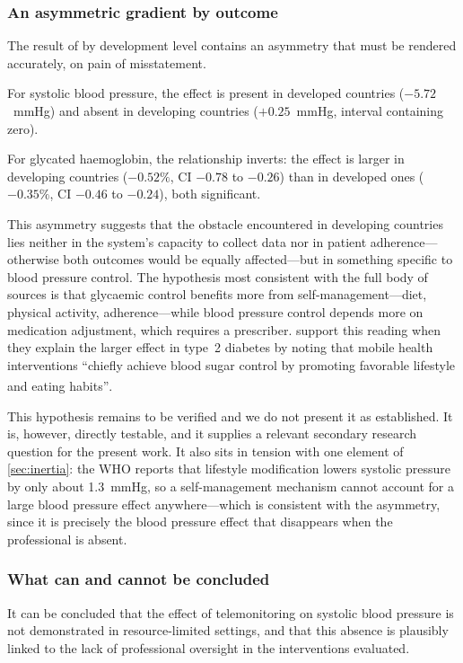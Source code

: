 \documentclass[12pt,a4paper,oneside]{report}
\newcommand{\bq}[1]{``#1''\textsuperscript{\dag}}
\begin{document}
\subsubsection{An asymmetric gradient by outcome}

The result of \textcite{mao2020} by development level contains an asymmetry that must be rendered accurately, on pain of misstatement.

For systolic blood pressure, the effect is present in developed countries ($-5.72$~mmHg) and absent in developing countries ($+0.25$~mmHg, interval containing zero).

For glycated haemoglobin, the relationship inverts: the effect is larger in developing countries ($-0.52\%$, CI $-0.78$ to $-0.26$) than in developed ones ($-0.35\%$, CI $-0.46$ to $-0.24$), both significant.

This asymmetry suggests that the obstacle encountered in developing countries lies neither in the system's capacity to collect data nor in patient adherence---otherwise both outcomes would be equally affected---but in something specific to blood pressure control. The hypothesis most consistent with the full body of sources is that glycaemic control benefits more from self-management---diet, physical activity, adherence---while blood pressure control depends more on medication adjustment, which requires a prescriber. \Textcite{mao2020} support this reading when they explain the larger effect in type~2 diabetes by noting that mobile health interventions \bq{chiefly achieve blood sugar control by promoting favorable lifestyle and eating habits}.

This hypothesis remains to be verified and we do not present it as established. It is, however, directly testable, and it supplies a relevant secondary research question for the present work. It also sits in tension with one element of \cref{sec:inertia}: the WHO reports that lifestyle modification lowers systolic pressure by only about 1.3~mmHg, so a self-management mechanism cannot account for a large blood pressure effect anywhere---which is consistent with the asymmetry, since it is precisely the blood pressure effect that disappears when the professional is absent.

\subsubsection{What can and cannot be concluded}

It can be concluded that the effect of telemonitoring on systolic blood pressure is not demonstrated in resource-limited settings, and that this absence is plausibly linked to the lack of professional oversight in the interventions evaluated.
\end{document}
